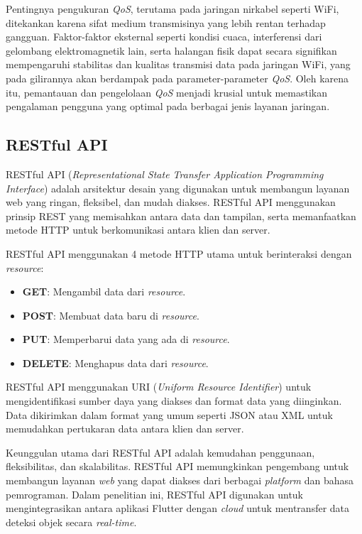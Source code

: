 Pentingnya pengukuran \emph{QoS}, terutama pada jaringan nirkabel seperti WiFi, ditekankan karena sifat medium transmisinya yang lebih rentan terhadap gangguan. Faktor-faktor eksternal seperti kondisi cuaca, interferensi dari gelombang elektromagnetik lain, serta halangan fisik dapat secara signifikan mempengaruhi stabilitas dan kualitas transmisi data pada jaringan WiFi, yang pada gilirannya akan berdampak pada parameter-parameter \emph{QoS}. Oleh karena itu, pemantauan dan pengelolaan \emph{QoS} menjadi krusial untuk memastikan pengalaman pengguna yang optimal pada berbagai jenis layanan jaringan. \parencite*{hariesanom2024}

\subsection{RESTful API}

RESTful API (\emph{Representational State Transfer Application Programming Interface}) adalah arsitektur desain yang digunakan untuk membangun layanan web yang ringan, fleksibel, dan mudah diakses. RESTful API menggunakan prinsip REST yang memisahkan antara data dan tampilan, serta memanfaatkan metode HTTP untuk berkomunikasi antara klien dan server.

RESTful API menggunakan 4 metode HTTP utama untuk berinteraksi dengan \emph{resource}:
\begin{itemize}[nolistsep]
  \item \textbf{GET}: Mengambil data dari \emph{resource}.
  \item \textbf{POST}: Membuat data baru di \emph{resource}.
  \item \textbf{PUT}: Memperbarui data yang ada di \emph{resource}.
  \item \textbf{DELETE}: Menghapus data dari \emph{resource}.
\end{itemize}

RESTful API menggunakan URI (\emph{Uniform Resource Identifier}) untuk mengidentifikasi sumber daya yang diakses dan format data yang diinginkan. Data dikirimkan dalam format yang umum seperti JSON atau XML untuk memudahkan pertukaran data antara klien dan server. \parencite*{restapi2016}

Keunggulan utama dari RESTful API adalah kemudahan penggunaan, fleksibilitas, dan skalabilitas. RESTful API memungkinkan pengembang untuk membangun layanan \emph{web} yang dapat diakses dari berbagai \emph{platform} dan bahasa pemrograman. Dalam penelitian ini, RESTful API digunakan untuk mengintegrasikan antara aplikasi Flutter dengan \emph{cloud} untuk mentransfer data deteksi objek secara \emph{real-time}.

